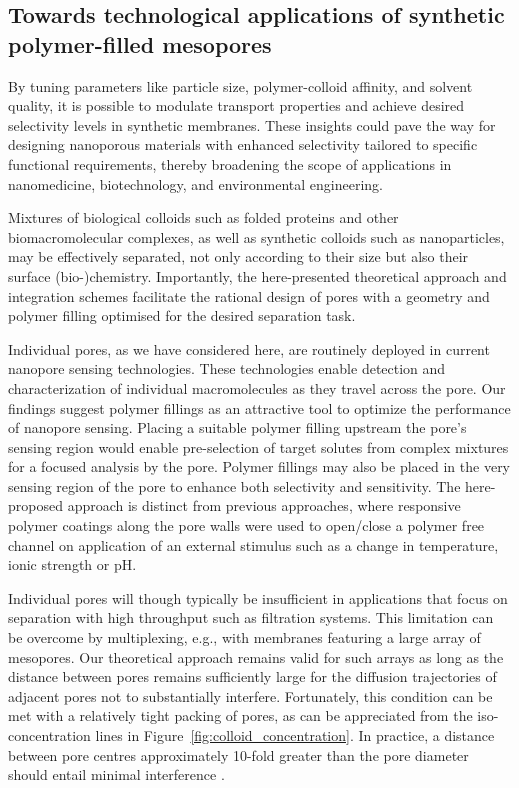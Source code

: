 \documentclass[12pt, a4paper]{article}
\begin{document}
\subsection{Towards technological applications of synthetic polymer-filled mesopores}

By tuning parameters like particle size, polymer-colloid affinity, and solvent quality, it is possible to modulate transport properties and achieve desired selectivity levels in synthetic membranes.
These insights could pave the way for designing nanoporous materials with enhanced selectivity tailored to specific functional requirements, thereby broadening the scope of applications in nanomedicine, biotechnology, and environmental engineering.

Mixtures of biological colloids such as folded proteins and other biomacromolecular complexes, as well as synthetic colloids such as nanoparticles, may be effectively separated, not only according to their size but also their surface (bio-)chemistry.
Importantly, the here-presented theoretical approach and integration schemes facilitate the rational design of pores with a geometry and polymer filling optimised for the desired separation task.

Individual pores, as we have considered here, are routinely deployed in current nanopore sensing technologies.
These technologies enable detection and characterization of individual macromolecules as they travel across the pore.
Our findings suggest polymer fillings as an attractive tool to optimize the performance of nanopore sensing.
Placing a suitable polymer filling upstream the pore's sensing region would enable pre-selection of target solutes from complex mixtures for a focused analysis by the pore.
Polymer fillings may also be placed in the very sensing region of the pore to enhance both selectivity and sensitivity.
The here-proposed approach is distinct from previous approaches, where responsive polymer coatings along the pore walls were used to open/close a polymer free channel on application of an external stimulus such as a change in temperature, ionic strength or pH. 

Individual pores will though typically be insufficient in applications that focus on separation with high throughput such as filtration systems.
This limitation can be overcome by multiplexing, e.g., with membranes featuring a large array of mesopores.
Our theoretical approach remains valid for such arrays as long as the distance between pores remains sufficiently large for the diffusion trajectories of adjacent pores not to substantially interfere.
Fortunately, this condition can be met with a relatively tight packing of pores, as can be appreciated from the iso-concentration lines in Figure~\ref{fig:colloid_concentration}.
In practice, a distance between pore centres approximately 10-fold greater than the pore diameter should entail minimal interference \cite{Fabrikant1985}.
\end{document}
